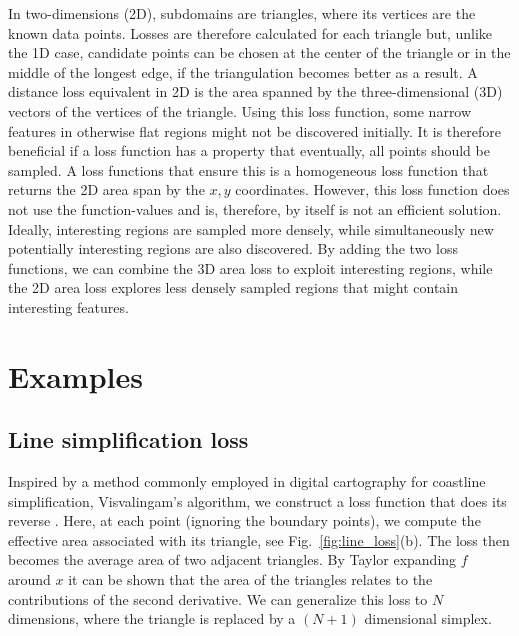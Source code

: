 In two-dimensions (2D), subdomains are triangles, where its vertices are the known data points.
Losses are therefore calculated for each triangle but, unlike the 1D case, candidate points can be chosen at the center of the triangle or in the middle of the longest edge, if the triangulation becomes better as a result.
A distance loss equivalent in 2D is the area spanned by the three-dimensional (3D) vectors of the vertices of the triangle.
Using this loss function, some narrow features in otherwise flat regions might not be discovered initially.
It is therefore beneficial if a loss function has a property that eventually, all points should be sampled.
A loss functions that ensure this is a homogeneous loss function that returns the 2D area span by the $x, y$ coordinates.
However, this loss function does not use the function-values and is, therefore, by itself is not an efficient solution.
Ideally, interesting regions are sampled more densely, while simultaneously new potentially interesting regions are also discovered.
By adding the two loss functions, we can combine the 3D area loss to exploit interesting regions, while the 2D area loss explores less densely sampled regions that might contain interesting features.

\section{Examples}

\subsection{Line simplification loss}


Inspired by a method commonly employed in digital cartography for coastline simplification, Visvalingam's algorithm, we construct a loss function that does its reverse \cite{Visvalingam1990}.
Here, at each point (ignoring the boundary points), we compute the effective area associated with its triangle, see Fig.~\ref{fig:line_loss}(b).
The loss then becomes the average area of two adjacent triangles.
By Taylor expanding $f$ around $x$ it can be shown that the area of the triangles relates to the contributions of the second derivative.
We can generalize this loss to $N$ dimensions, where the triangle is replaced by a $(N+1)$ dimensional simplex.

